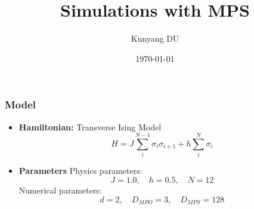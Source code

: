 \documentclass{beamer}
\title{Simulations with MPS}
\author{Kunyang DU}
\institute{Institue of Theoretical Physics}
\date{\today}
\begin{document}
\begin{frame}
	\titlepage
\end{frame}

\begin{frame}
	\frametitle{Model}
	\begin{itemize}
		\item \textbf{Hamiltonian:} Transverse Ising Model
		\begin{equation}
			H = J\sum_{i}^{N-1}\sigma_i \sigma_{i+1} + h\sum_i^N\sigma_i
		\end{equation}
		\item \textbf{Parameters} Physics parameters:
		\begin{equation}
			J = 1.0,\quad h = 0.5,\quad N = 12
		\end{equation}
		Numerical parameters:
		\begin{equation}
			d = 2,\quad D_{MPO} = 3, \quad D_{MPS} = 128
		\end{equation}
	\end{itemize}
\end{frame}
\end{document}
